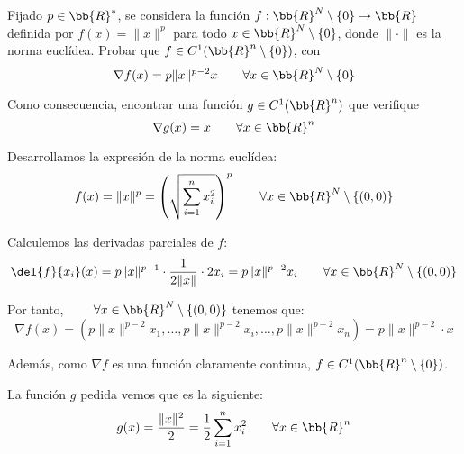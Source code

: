 \begin{ejercicio}
    Fijado $p\in \bb{R}^\ast$, se considera la función $f:\bb{R}^N\setminus \{0\}\to \bb{R}$ definida por $f(x) = \|x\|^p$ para todo $x\in \bb{R}^N\setminus \{0\}$, donde $\|\cdot\|$ es la norma euclídea. Probar que $f\in C^1(\bb{R}^n\setminus \{0\})$, con
    \begin{equation*}
        \nabla f(x) = p\|x\|^{p-2}x \qquad \forall x\in \bb{R}^N\setminus \{0\}
    \end{equation*}

    Como consecuencia, encontrar una función $g\in C^1(\bb{R}^n)$ que verifique 
    \begin{equation*}
        \nabla g(x)=x \qquad \forall x\in \bb{R}^n
    \end{equation*}

    Desarrollamos la expresión de la norma euclídea:
    \begin{equation*}
        f(x) = \|x\|^p = \left(\sqrt{\sum_{i=1}^n x_i^2}\right)^p \qquad \forall x\in \bb{R}^N\setminus \{(0,0)\}
    \end{equation*}

    Calculemos las derivadas parciales de $f$:
    \begin{equation*}
        \del{f}{x_i}(x) = p\|x\|^{p-1}\cdot \frac{1}{2\|x\|}\cdot 2x_i = p\|x\|^{p-2}x_i \qquad \forall x\in \bb{R}^N\setminus \{(0,0)\}
    \end{equation*}

    Por tanto, $\qquad \forall x\in \bb{R}^N\setminus \{(0,0)\}$ tenemos que:
    \begin{equation*}
        \nabla f(x) = \left(p\|x\|^{p-2}x_1,\dots, p\|x\|^{p-2}x_i, \dots, p\|x\|^{p-2}x_n\right) = p\|x\|^{p-2} \cdot x
    \end{equation*}

    Además, como $\nabla f$ es una función claramente continua, $f\in C^1(\bb{R}^n\setminus \{0\})$.

    La función $g$ pedida vemos que es la siguiente:
    \begin{equation*}
        g(x) = \frac{\|x\|^2}{2} = \frac{1}{2} \sum_{i=1}^n x_i^2 \qquad \forall x\in \bb{R}^n
    \end{equation*}
\end{ejercicio}


